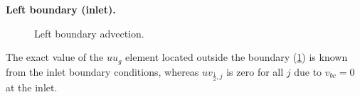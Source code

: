 \documentclass{article}
\begin{document}
%

\textbf{Left boundary (inlet).} 
\begin{figure}[H] %
  \caption{Left boundary advection.}\label{fig:ADV-left}
\end{figure}
The exact value of the $uu_g$ element located outside the boundary (\cref{fig:ADV-left}) is known from the inlet boundary conditions, whereas $uv_{\frac{1}{2},j}$ is zero for all $j$ due to $v_{bc}=0$ at the inlet. 
\end{document}
